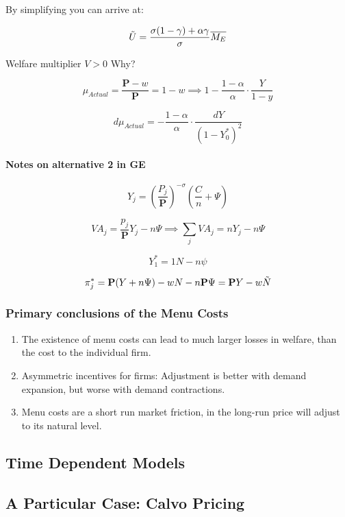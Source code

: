 By simplifying you can arrive at:

$$
\Tilde{U} = \frac{\sigma (1 - \gamma)+\alpha \gamma}{\sigma} \overline{M_E}
$$

Welfare multiplier $V > 0$ Why?


$$
\mu_{Actual} = \frac{\mathbf{P} - w}{\mathbf{P}} = 1 - w \implies
1 - \frac {1 - \alpha } { \alpha } \cdot \frac { Y } { 1 - y }
$$

$$
d\mu_{Actual} = - \frac{1- \alpha}{\alpha} \cdot \frac{dY}{(1 - Y_0^*)^2}
$$

\paragraph{Notes on alternative 2 in GE}

$$
Y_j = \left( \frac{P_j}{\mathbf{P}}  \right)^{- \sigma} \left( \frac{C}{n} + \Psi   \right)
$$

$$
VA_j = \frac{p_j}{\mathbf{P}}Y_j - n\Psi \implies \sum_{j} VA_j = nY_j  - n \Psi
$$


$$
Y_1^* = 1 N - n \psi 
$$




$$
\pi_j^* = \mathbf{P}(Y + n \Psi) - wN - n\mathbf{P}\Psi = \mathbf{P}Y - w\Tilde{N}
$$



\subsubsection{Primary conclusions of the Menu Costs}
\begin{enumerate}[i]
  \item The existence of menu costs can lead to much larger losses in welfare, than the cost to the individual firm.
  \item Asymmetric incentives for firms: Adjustment is better with demand expansion, but worse with demand contractions.
  \item Menu costs are a short run market friction, in the long-run price will adjust to its natural level.
\end{enumerate}


\newpage
\subsection*{Time Dependent Models}
\subsection{A Particular Case: Calvo Pricing}

